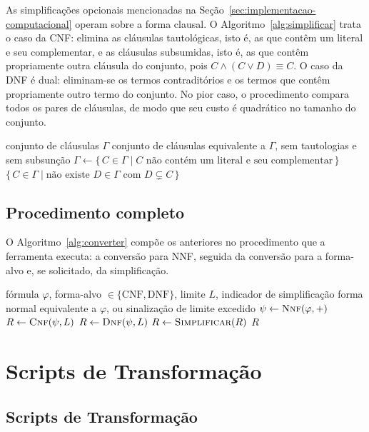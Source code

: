 \documentclass[12pt,a4paper,oneside]{report}
\theoremstyle{tituloplain}
\theoremstyle{titulodef}
\begin{document}
As simplificações opcionais mencionadas na Seção~\ref{sec:implementacao-computacional} operam sobre a forma clausal. O Algoritmo~\ref{alg:simplificar} trata o caso da CNF: elimina as cláusulas tautológicas, isto é, as que contêm um literal e seu complementar, e as cláusulas subsumidas, isto é, as que contêm propriamente outra cláusula do conjunto, pois $C\wedge(C\vee D)\equiv C$. O caso da DNF é dual: eliminam-se os termos contraditórios e os termos que contêm propriamente outro termo do conjunto. No pior caso, o procedimento compara todos os pares de cláusulas, de modo que seu custo é quadrático no tamanho do conjunto.

\begin{algorithm}[htbp]
\caption{Simplificação de uma CNF}\label{alg:simplificar}
\begin{algorithmic}[1]
\Require conjunto de cláusulas $\Gamma$
\Ensure conjunto de cláusulas equivalente a $\Gamma$, sem tautologias e sem subsunção
  \State $\Gamma\gets\{\,C\in\Gamma \mid C \text{ não contém um literal e seu complementar}\,\}$
  \State \Return $\{\,C\in\Gamma \mid \text{não existe } D\in\Gamma \text{ com } D\subsetneq C\,\}$
\EndFunction
\end{algorithmic}
\end{algorithm}

\section{Procedimento completo}

O Algoritmo~\ref{alg:converter} compõe os anteriores no procedimento que a ferramenta executa: a conversão para NNF, seguida da conversão para a forma-alvo e, se solicitado, da simplificação.

\begin{algorithm}[htbp]
\caption{Conversão completa para CNF ou DNF}\label{alg:converter}
\begin{algorithmic}[1]
\Require fórmula $\varphi$, forma-alvo $\in\{\text{CNF},\text{DNF}\}$, limite $L$, indicador de simplificação
\Ensure forma normal equivalente a $\varphi$, ou sinalização de limite excedido
  \State $\psi\gets\textsc{Nnf}(\varphi,+)$
    \State $R\gets\textsc{Cnf}(\psi,L)$
  \Else
    \State $R\gets\textsc{Dnf}(\psi,L)$
  \EndIf
   \State $R\gets\textsc{Simplificar}(R)$  \EndIf
  \State \Return $R$
\EndFunction
\end{algorithmic}
\end{algorithm}

\chapter{Scripts de Transformação}\label{app:scripts}
\section{Scripts de Transformação}
\end{document}
